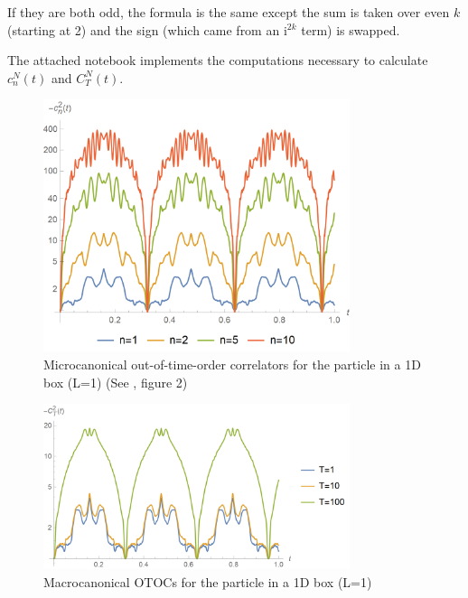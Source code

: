 \documentclass{article}
\newcommand{\I}{\mathrm{i}}
\begin{document}
If they are both odd, the formula is the same except the sum is taken over even $k$ (starting at 2) and the sign (which came from an $\I^{2k}$ term) is swapped.

The attached notebook implements the computations necessary to calculate $c_n^N(t)$ and $C_T^N(t)$.

\begin{figure}
\centering
\includegraphics[width=0.8\textwidth]{microcanonicalwell}
\caption{Microcanonical out-of-time-order correlators for the particle in a 1D box (L=1) (See \cite{Hashimoto_2017}, figure 2)}
\end{figure}
\begin{figure}
\centering
\includegraphics[width=0.8\textwidth]{macrocanonicalwell}
\caption{Macrocanonical OTOCs for the particle in a 1D box (L=1)}
\end{figure}
\end{document}
